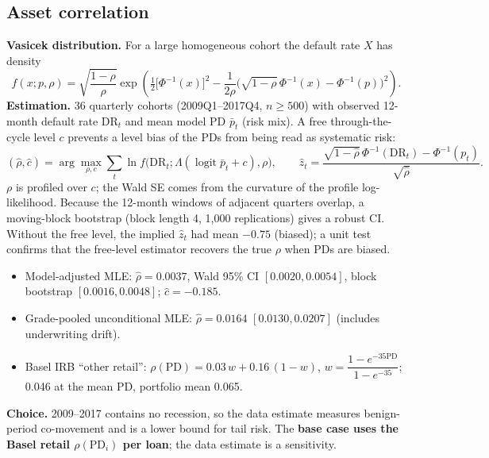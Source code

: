 \documentclass[11pt,a4paper]{article}
\newcommand{\PD}{\mathrm{PD}}
\newcommand{\logit}{\operatorname{logit}}
\newcommand{\1}{\mathbf{1}}
\begin{document}
\subsection{Asset correlation}
\textbf{Vasicek distribution.} For a large homogeneous cohort the default rate $X$ has density
\begin{equation}
f(x;p,\rho)=\sqrt{\frac{1-\rho}{\rho}}\exp\!\left(\tfrac12\big[\Phi^{-1}(x)\big]^2-\frac{1}{2\rho}\Big(\sqrt{1-\rho}\,\Phi^{-1}(x)-\Phi^{-1}(p)\Big)^2\right).
\end{equation}
\textbf{Estimation.} 36 quarterly cohorts (2009Q1--2017Q4, $n\ge500$) with observed 12-month default rate $\mathrm{DR}_t$ and mean model PD $\bar p_t$ (risk mix). A free through-the-cycle level $c$ prevents a level bias of the PDs from being read as systematic risk:
\begin{equation}
(\hat\rho,\hat c)=\arg\max_{\rho,c}\sum_{t}\ln f\big(\mathrm{DR}_t;\Lambda(\logit\bar p_t+c),\rho\big),\qquad
\hat z_t=\frac{\sqrt{1-\hat\rho}\,\Phi^{-1}(\mathrm{DR}_t)-\Phi^{-1}(p_t)}{\sqrt{\hat\rho}} .
\end{equation}
$\rho$ is profiled over $c$; the Wald SE comes from the curvature of the profile log-likelihood. Because the 12-month windows of adjacent quarters overlap, a moving-block bootstrap (block length 4, 1{,}000 replications) gives a robust CI. Without the free level, the implied $\hat z_t$ had mean $-0.75$ (biased); a unit test confirms that the free-level estimator recovers the true $\rho$ when PDs are biased.

\begin{itemize}[itemsep=1pt]
\item Model-adjusted MLE: $\hat\rho=\mathbf{0.0037}$, Wald 95\% CI $[0.0020,0.0054]$, block bootstrap $[0.0016,0.0048]$; $\hat c=-0.185$.
\item Grade-pooled unconditional MLE: $\hat\rho=0.0164$ $[0.0130,0.0207]$ (includes underwriting drift).
\item Basel IRB ``other retail'': $\rho(\PD)=0.03\,w+0.16\,(1-w)$, $w=\dfrac{1-e^{-35\PD}}{1-e^{-35}}$; 0.046 at the mean PD, portfolio mean 0.065.
\end{itemize}
\textbf{Choice.} 2009--2017 contains no recession, so the data estimate measures benign-period co-movement and is a lower bound for tail risk. The \textbf{base case uses the Basel retail $\rho(\PD_i)$ per loan}; the data estimate is a sensitivity.

\begin{table}[H]\centering\scriptsize
\caption{Quarterly cohorts used for the correlation estimate (DR and PD in \%, $\hat z_t$ implied factor).}

\end{table}
\end{document}
